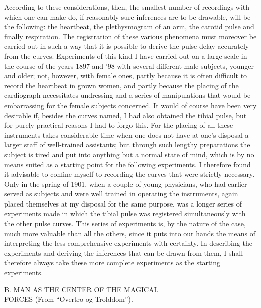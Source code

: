 \documentclass[12pt,a4paper,openany]{book}
\newcommand{\opage}[1]{\marginnote{\footnotesize\textit{[#1]}}}
\newcommand{\excerpthead}[1]{\par\bigskip\begin{center}#1\end{center}\nopagebreak\smallskip}
\begin{document}
According to these considerations, then, the smallest number of recordings
with which one can make do, if reasonably sure
inferences are to be drawable, will be the following: the heartbeat,
the plethysmogram of an arm, the carotid pulse and finally respiration.
The registration of these various phenomena must
\setcounter{footnote}{0}%
\opage{281}moreover be carried out in such a way that it is possible to derive the pulse delay
accurately from the curves. Experiments of this kind I have
carried out on a large scale in the course of the years 1897 and '98 with
several different male subjects, younger and older; not, however,
with female ones, partly because it is often difficult to record %
the heartbeat in grown women, and partly because the placing of the cardiograph
necessitates undressing and a series of
manipulations that would be embarrassing for the female
subjects concerned. It would of course have been very
desirable if, besides the curves named, I had also
obtained the tibial pulse, but for purely practical reasons I had
to forgo this. For the placing of all these instruments
takes considerable time when one does not have at one's disposal a
larger staff of well-trained assistants; but through such lengthy
preparations the subject is tired and put into anything but
a normal state of mind, which is by no means suited as a starting point
for the following experiments. I therefore found it advisable
to confine myself to recording the curves that
were strictly necessary. Only in the spring of 1901, when a couple of
young physicians, who had earlier served as subjects
and were well trained in operating the instruments, again placed
themselves at my disposal for the same purpose, was
a longer series of experiments made in which the tibial pulse was registered
simultaneously with the other pulse curves. This series of experiments
is, by the nature of the case, much more valuable than all
the others, since it puts into our hands the means of interpreting
the less comprehensive experiments with certainty. In describing
the experiments and deriving the inferences that can
be drawn from them, I shall therefore always take these more complete
experiments as the starting experiments.

\setcounter{footnote}{0}%
\excerpthead{B. MAN AS THE CENTER OF THE MAGICAL \\ FORCES (From ``Overtro og Trolddom'').}\opage{282}
\end{document}
